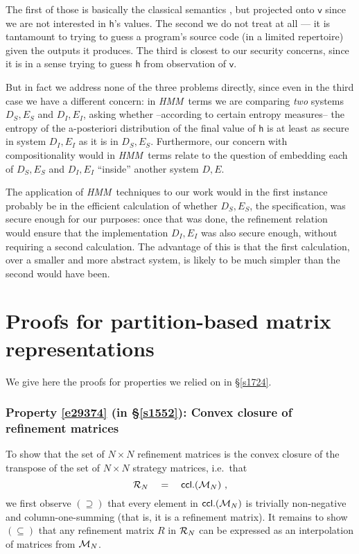 \documentclass[runningheads]{llncs}
\newcommand\CCL {\mathsf{ccl}}
\newcommand\Vh {\mathsf{h}}
\newcommand\Vv {\mathsf{v}}
\newcommand\Sec[1] {Sec.~\ref{#1}}
\renewcommand\Sec[1] {\S\ref{#1}}
\newcommand\HMM {\textit{HMM}}
\newcommand{\RefMatrices}{{\cal R}}
\newcommand{\FinerMatrices}{{\cal M}} \newcommand{\StratMatrices}{{\cal G}}
\newcommand\Wide[1] {~~~#1~~~}
\begin{document}
The first of those is basically the classical semantics \cite{Kozen:85,McIver:05a}, but projected onto $\Vv$ since we are not interested in $\Vh$'s values. The second we do not treat at all --- it is tantamount to trying to guess a program's source code (in a limited repertoire) given the outputs it produces. The third is closest to our security concerns, since it is in a sense trying to guess $\Vh$ from observation of $\Vv$.

But in fact we address none of the three problems directly, since even in the third case we have a different concern: in \HMM\ terms we are comparing \emph{two} systems  $D_S,E_S$ and $D_I,E_I$, asking  whether --according to certain entropy measures-- the entropy of the a-posteriori distribution of the final value of $\Vh$ is at least as secure in system $D_I,E_I$ as it is in $D_S,E_S$. Furthermore, our concern with compositionality would in \HMM\ terms relate to the question of embedding each of $D_S,E_S$ and $D_I,E_I$ ``inside'' another system $D,E$.

The application of \HMM\ techniques to our work would in the first instance probably be in the efficient calculation of whether $D_S,E_S$, the specification, was secure enough for our purposes: once that was done, the refinement relation would ensure that the implementation $D_I,E_I$ was also secure enough, without requiring a second calculation. The advantage of this is that the first calculation, over a smaller and more abstract system, is likely to be much simpler than the second would have been.




\newpage
\appendix

\section{Proofs for partition-based matrix representations}\label{a39475}

We give here the proofs for properties we relied on in \Sec{s1724}.

\subsubsection{Property \ref{e29374} (in \Sec{s1552}): Convex closure of refinement matrices}

To show that the set of $N{\times}N$ refinement matrices is the convex closure of the transpose of the set of $N{\times}N$ strategy matrices, i.e.\ that
\begin{equation*} \RefMatrices_{N} \Wide{=} \CCL.(\FinerMatrices_{N})~, 
\end{equation*}
we first observe $(\supseteq)$ that every element in $\CCL.(\FinerMatrices_{N})$ is trivially non-negative and column-one-summing (that is, it is a refinement matrix). It remains to show $(\subseteq)$ that any refinement matrix $R$ in $\RefMatrices_{N}$ can be expressed as an interpolation of matrices from $\FinerMatrices_{N}$.
\end{document}

